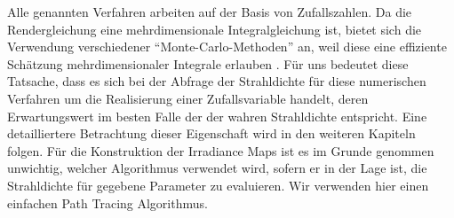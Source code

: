 		Alle genannten Verfahren arbeiten auf der Basis von Zufallszahlen.
		Da die Rendergleichung eine mehrdimensionale Integralgleichung ist, bietet sich die Verwendung verschiedener \enquote{Monte-Carlo-Methoden} an, weil diese eine effiziente Schätzung mehrdimensionaler Integrale erlauben \cite{monte-carlo-method}.
		Für uns bedeutet diese Tatsache, dass es sich bei der Abfrage der Strahldichte für diese numerischen Verfahren um die Realisierung einer Zufallsvariable handelt, deren Erwartungswert im besten Falle der der wahren Strahldichte entspricht.
		Eine detailliertere Betrachtung dieser Eigenschaft wird in den weiteren Kapiteln folgen.
		Für die Konstruktion der Irradiance Maps ist es im Grunde genommen unwichtig, welcher Algorithmus verwendet wird, sofern er in der Lage ist, die Strahldichte für gegebene Parameter zu evaluieren.
		Wir verwenden hier einen einfachen Path Tracing Algorithmus.





